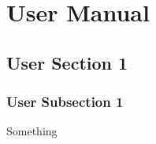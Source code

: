 {\let\clearpage\relax \chapter{User Manual}}
\section {User Section 1}
    \subsection {User Subsection 1}
    Something